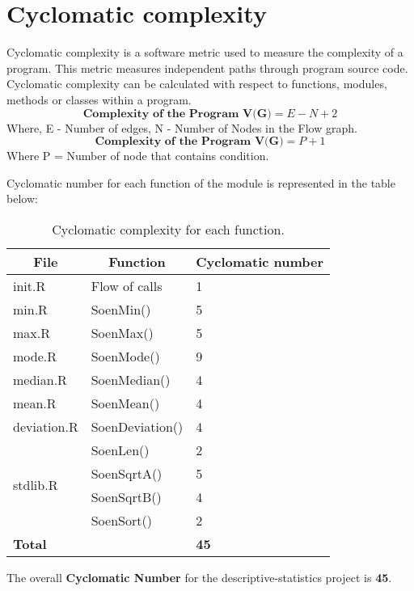 \documentclass[12pt]{article}
\begin{document}
\section{Cyclomatic complexity}
Cyclomatic complexity is a software metric used to measure the complexity of a program. This metric measures independent paths through program source code. Cyclomatic complexity can be calculated with respect to functions, modules, methods or classes within a program.
\begin{equation}
    \textbf{Complexity of the Program V(G)} = E - N + 2
\end{equation}
Where, E - Number of edges, N - Number of Nodes in the Flow graph.
\begin{equation}
    \textbf{Complexity of the Program V(G)} = P + 1 
\end{equation}
Where P = Number of node that contains condition.\cite{CN}\\
\par Cyclomatic number for each function of the module is represented in the table below:
\begin{table}[h]
\centering
\begin{tabular}{|l|l|l|}
\hline
\multicolumn{1}{|c|}{\textbf{File}} & \multicolumn{1}{c|}{\textbf{Function}} & \multicolumn{1}{c|}{\textbf{Cyclomatic number}} \\ \hline
init.R & Flow of calls & 1 \\ \hline
min.R & SoenMin() & 5 \\ \hline
max.R & SoenMax() & 5 \\ \hline
mode.R & SoenMode() & 9 \\ \hline
median.R & SoenMedian() & 4 \\ \hline
mean.R & SoenMean() & 4 \\ \hline
deviation.R & SoenDeviation() & 4 \\ \hline
\multirow{4}{*}{stdlib.R} & SoenLen() & 2 \\ \cline{2-3} 
 & SoenSqrtA() & 5 \\ \cline{2-3} 
 & SoenSqrtB() & 4 \\ \cline{2-3} 
 & SoenSort() & 2 \\ \hline
\textbf{Total} & \textbf{} & \textbf{45} \\ \hline
\end{tabular}
\caption{Cyclomatic complexity for each function.}
\label{my-label}
\end{table}

The overall \textbf{Cyclomatic Number} for the descriptive-statistics project is \textbf{45}.\\
\end{document}

